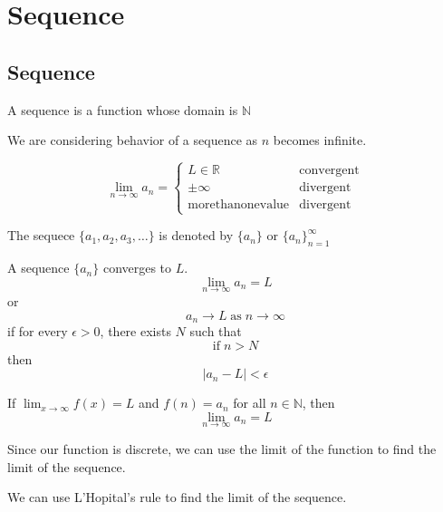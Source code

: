 \chapter{Sequence}

\section{Sequence}

\begin{definition}[Sequence]
  A sequence is a function whose domain is \(\mathbb{N}\)
\end{definition}

We are considering behavior of a sequence as \(n\) becomes infinite.

\[
  \lim_{n \to \infty} a_n = \begin{cases}
    L \in \mathbb{R} & \text{convergent} \\
    \pm \infty & \text{divergent} \\
    \mathrm{more than one value} & \text{divergent}
  \end{cases}
\]

\begin{definition}
  The sequece \(\{a_1, a_2, a_3, \dots\}\) is denoted by \(\{a_n\}\) or \(\{a_n\}_{n=1}^{\infty}\)
\end{definition}

\begin{theorem}
  A sequence \(\{a_n\}\) converges to \(L\).
  \[
    \lim_{n \to \infty} a_n = L
  \]
  or
  \[
    a_n \to L \; \mathrm{as} \; n \to \infty
  \]
  if for every \(\epsilon > 0\), there exists \(N\) such that
  \[
    \mathrm{if} \; n > N 
  \]
  then
  \[
    |a_n - L| < \epsilon
  \]
\end{theorem}

\begin{theorem}[]
  If \(\lim_{x \to \infty} f(x) = L\) and \(f(n) = a_n\) for all \(n \in \mathbb{N}\), then
  \[
    \lim_{n \to \infty} a_n = L
  \]
\end{theorem}

Since our function is discrete, we can use the limit of the function to find the limit of the sequence.

\begin{remark}
  We can use L'Hopital's rule to find the limit of the sequence.
\end{remark}


